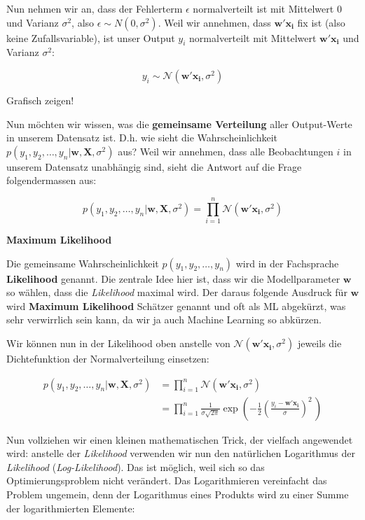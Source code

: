 \documentclass[
]{book}
\begin{document}
Nun nehmen wir an, dass der Fehlerterm \(\epsilon\) normalverteilt ist mit Mittelwert 0 und Varianz \(\sigma^2\), also \(\epsilon \sim N(0,\sigma^2)\). Weil wir annehmen, dass \(\mathbf{w}' \mathbf{x_i}\) fix ist (also keine Zufallsvariable), ist unser Output \(y_i\) normalverteilt mit Mittelwert \(\mathbf{w}' \mathbf{x_i}\) und Varianz \(\sigma^2\):

\[
y_i \sim \mathcal{N}\left(\mathbf{w}' \mathbf{x_i}, \sigma^2\right)
\]

Grafisch zeigen!

Nun möchten wir wissen, was die \textbf{gemeinsame Verteilung} aller Output-Werte in unserem Datensatz ist. D.h. wie sieht die Wahrscheinlichkeit \(p(y_1,y_2,\dots,y_n|\mathbf{w},\mathbf{X},\sigma^2)\) aus? Weil wir annehmen, dass alle Beobachtungen \(i\) in unserem Datensatz unabhängig sind, sieht die Antwort auf die Frage folgendermassen aus:

\[
p(y_1,y_2,\dots,y_n|\mathbf{w},\mathbf{X},\sigma^2) = \prod_{i=1}^n \mathcal{N}\left(\mathbf{w}' \mathbf{x_i}, \sigma^2\right)
\]

\textbf{Maximum Likelihood}

Die gemeinsame Wahrscheinlichkeit \(p(y_1,y_2,\dots,y_n)\) wird in der Fachsprache \textbf{Likelihood} genannt. Die zentrale Idee hier ist, dass wir die Modellparameter \(\mathbf{w}\) so wählen, dass die \emph{Likelihood} maximal wird. Der daraus folgende Ausdruck für \(\mathbf{w}\) wird \textbf{Maximum Likelihood} Schätzer genannt und oft als ML abgekürzt, was sehr verwirrlich sein kann, da wir ja auch Machine Learning so abkürzen.

Wir können nun in der Likelihood oben anstelle von \(\mathcal{N}\left(\mathbf{w}' \mathbf{x_i}, \sigma^2\right)\) jeweils die Dichtefunktion der Normalverteilung einsetzen:

\begin{align}
p(y_1,y_2,\dots,y_n|\mathbf{w},\mathbf{X},\sigma^2) &= \prod_{i=1}^n \mathcal{N}\left(\mathbf{w}' \mathbf{x_i}, \sigma^2\right) \\
&= \prod_{i=1}^n \frac{1}{\sigma\sqrt{2\pi}} \exp\left( -\frac{1}{2}\left(\frac{y_i - \mathbf{w}' \mathbf{x_i}}{\sigma}\right)^{\!2}\,\right)
\end{align}

Nun vollziehen wir einen kleinen mathematischen Trick, der vielfach angewendet wird: anstelle der \emph{Likelihood} verwenden wir nun den natürlichen Logarithmus der \emph{Likelihood} (\emph{Log-Likelihood}). Das ist möglich, weil sich so das Optimierungsproblem nicht verändert. Das Logarithmieren vereinfacht das Problem ungemein, denn der Logarithmus eines Produkts wird zu einer Summe der logarithmierten Elemente:
\end{document}

